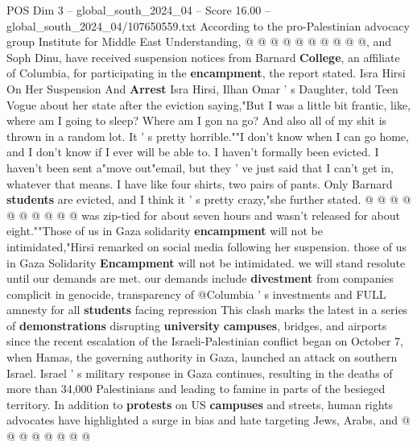 \begin{textsample}{POS Dim 3 – global\_south\_2024\_04 – Score 16.00 – global\_south\_2024\_04/107650559.txt}
According to the pro-Palestinian advocacy group Institute for Middle East Understanding, @ @ @ @ @ @ @ @ @ @, and Soph Dinu, have received suspension notices from Barnard \textbf{College}, an affiliate of Columbia, for participating in the \textbf{encampment}, the report stated.
Isra Hirsi On Her Suspension And \textbf{Arrest} Isra Hirsi, Ilhan Omar ' s Daughter, told Teen Vogue about her state after the eviction saying,"But I was a little bit frantic, like, where am I going to sleep?
Where am I gon na go?
And also all of my shit is thrown in a random lot.
It ' s pretty horrible.""I don't know when I can go home, and I don't know if I ever will be able to.
I haven't formally been evicted.
I haven't been sent a"move out"email, but they ' ve just said that I can't get in, whatever that means.
I have like four shirts, two pairs of pants.
Only Barnard \textbf{students} are evicted, and I think it ' s pretty crazy,"she further stated. @ @ @ @ @ @ @ @ @ @ was zip-tied for about seven hours and wasn't released for about eight.""Those of us in Gaza solidarity \textbf{encampment} will not be intimidated,"Hirsi remarked on social media following her suspension. those of us in Gaza Solidarity \textbf{Encampment} will not be intimidated. we will stand resolute until our demands are met. our demands include \textbf{divestment} from companies complicit in genocide, transparency of @Columbia ' s investments and FULL amnesty for all \textbf{students} facing repression This clash marks the latest in a series of \textbf{demonstrations} disrupting \textbf{university} \textbf{campuses}, bridges, and airports since the recent escalation of the Israeli-Palestinian conflict began on October 7, when Hamas, the governing authority in Gaza, launched an attack on southern Israel.
Israel ' s military response in Gaza continues, resulting in the deaths of more than 34,000 Palestinians and leading to famine in parts of the besieged territory.
In addition to \textbf{protests} on US \textbf{campuses} and streets, human rights advocates have highlighted a surge in bias and hate targeting Jews, Arabs, and @ @ @ @ @ @ @ @

\end{textsample}
